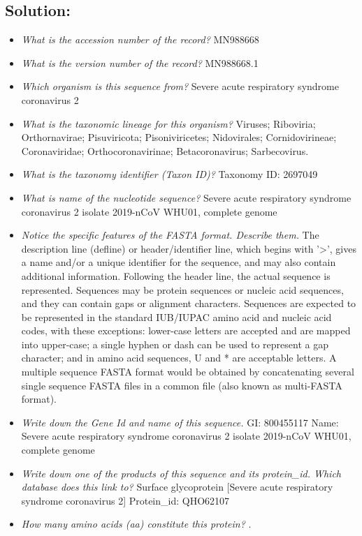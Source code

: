 \documentclass[en,black,12pt,normal]{elegantnote}
\newcommand{\upcite}[1]{\textsuperscript{\textsuperscript{\cite{#1}}}}
\begin{document}
\subsection*{Solution:}
\begin{itemize}
    \item \textit{What is the accession number of the record?}
    \subitem MN988668
    \item \textit{What is the version number of the record?}
    \subitem MN988668.1
    \item \textit{Which organism is this sequence from?}
    \subitem Severe acute respiratory syndrome coronavirus 2
    \item \textit{What is the taxonomic lineage for this organism?}
    \subitem Viruses; Riboviria; Orthornavirae; Pisuviricota; Pisoniviricetes;
    \subitem Nidovirales; Cornidovirineae; Coronaviridae; Orthocoronavirinae;
    \subitem Betacoronavirus; Sarbecovirus.
    \item \textit{What is the taxonomy identifier (Taxon ID)?}
    \subitem Taxonomy ID: 2697049
    \item \textit{What is name of the nucleotide sequence?}
    \subitem Severe acute respiratory syndrome coronavirus 2 isolate 2019-nCoV WHU01, complete genome
    \item \textit{Notice the specific features of the FASTA format. Describe them.}
    \subitem The description line (defline) or header/identifier line, which begins with '>', gives a name and/or a unique identifier for the sequence, and may also contain additional information.
    \subitem Following the header line, the actual sequence is represented. Sequences may be protein sequences or nucleic acid sequences, and they can contain gaps or alignment characters. 
    Sequences are expected to be represented in the standard IUB/IUPAC amino acid and nucleic acid codes, with these exceptions: lower-case letters are accepted and are mapped into upper-case; a single hyphen or dash can be used to represent a gap character; and in amino acid sequences, U and * are acceptable letters.
    \subitem A multiple sequence FASTA format would be obtained by concatenating several single sequence FASTA files in a common file (also known as multi-FASTA format). \upcite{wiki:FASTA_format}
    \item \textit{Write down the Gene Id and name of this sequence.}
    \subitem GI: 800455117
    \subitem Name: Severe acute respiratory syndrome coronavirus 2 isolate 2019-nCoV WHU01, complete genome
    \item \textit{Write down one of the products of this sequence and its protein\_id. Which database does this link to?}
    \subitem Surface glycoprotein [Severe acute respiratory syndrome coronavirus 2]
    \subitem Protein\_id: QHO62107
    \item \textit{How many amino acids (aa) constitute this protein?}
    .
\end{itemize}

{}
\end{document}
